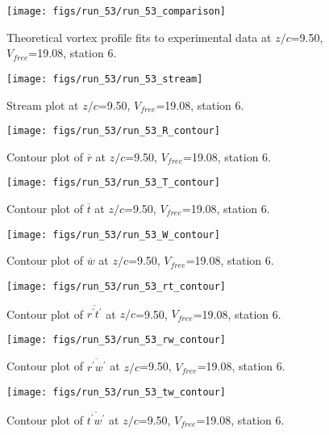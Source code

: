 \begin{figure}[H]
\centering
\texttt{[image: figs/run\_53/run\_53\_comparison]}
\caption{Theoretical vortex profile fits to experimental data at $z/c$=9.50, $V_{free}$=19.08, station 6.}
\label{fig:run_53_comparison}
\end{figure}


\begin{figure}[H]
\centering
\texttt{[image: figs/run\_53/run\_53\_stream]}
\caption{Stream plot at $z/c$=9.50, $V_{free}$=19.08, station 6.}
\label{fig:run_53_stream}
\end{figure}


\begin{figure}[H]
\centering
\texttt{[image: figs/run\_53/run\_53\_R\_contour]}
\caption{Contour plot of $\overline{r}$ at $z/c$=9.50, $V_{free}$=19.08, station 6.}
\label{fig:run_53_R_contour}
\end{figure}


\begin{figure}[H]
\centering
\texttt{[image: figs/run\_53/run\_53\_T\_contour]}
\caption{Contour plot of $\overline{t}$ at $z/c$=9.50, $V_{free}$=19.08, station 6.}
\label{fig:run_53_T_contour}
\end{figure}


\begin{figure}[H]
\centering
\texttt{[image: figs/run\_53/run\_53\_W\_contour]}
\caption{Contour plot of $\overline{w}$ at $z/c$=9.50, $V_{free}$=19.08, station 6.}
\label{fig:run_53_W_contour}
\end{figure}


\begin{figure}[H]
\centering
\texttt{[image: figs/run\_53/run\_53\_rt\_contour]}
\caption{Contour plot of $\overline{r^\prime t^\prime}$ at $z/c$=9.50, $V_{free}$=19.08, station 6.}
\label{fig:run_53_rt_contour}
\end{figure}


\begin{figure}[H]
\centering
\texttt{[image: figs/run\_53/run\_53\_rw\_contour]}
\caption{Contour plot of $\overline{r^\prime w^\prime}$ at $z/c$=9.50, $V_{free}$=19.08, station 6.}
\label{fig:run_53_rw_contour}
\end{figure}


\begin{figure}[H]
\centering
\texttt{[image: figs/run\_53/run\_53\_tw\_contour]}
\caption{Contour plot of $\overline{t^\prime w^\prime}$ at $z/c$=9.50, $V_{free}$=19.08, station 6.}
\label{fig:run_53_tw_contour}
\end{figure}


